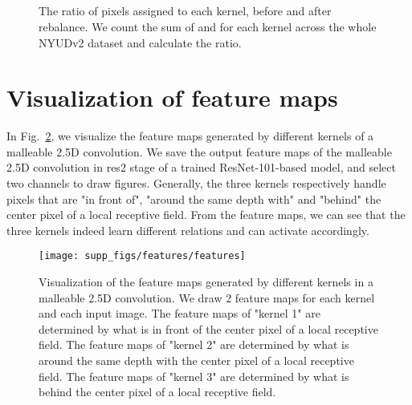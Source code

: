 \documentclass[runningheads]{llncs}
\begin{document}
\begin{figure}[htbp]
  \centering
  \\
  \\
  \\
  \\
  \caption{
    The ratio of pixels assigned to each kernel, before and after rebalance.
    We count the sum of  and  for each kernel across the whole NYUDv2 dataset and calculate the ratio.
  }
  \label{fig:rebalance}
\end{figure}

\section{Visualization of feature maps}
In Fig.~\ref{fig:features}, we visualize the feature maps generated by different kernels of a malleable 2.5D convolution.
We save the output feature maps of the malleable 2.5D convolution in res2 stage of a trained ResNet-101-based model, and select two channels to draw figures.
Generally, the three kernels respectively handle pixels that are "in front of", "around the same depth with" and "behind" the center pixel of a local receptive field.
From the feature maps, we can see that the three kernels indeed learn different relations and can activate accordingly.

\begin{figure}[htbp]
  \centering
  \texttt{[image: supp\_figs/features/features]}
  \caption{
  Visualization of the feature maps generated by different kernels in a malleable 2.5D convolution.
  We draw 2 feature maps for each kernel and each input image.
  The feature maps of "kernel 1" are determined by what is in front of the center pixel of a local receptive field.
  The feature maps of "kernel 2" are determined by what is around the same depth with the center pixel of a local receptive field.
  The feature maps of "kernel 3" are determined by what is behind the center pixel of a local receptive field.
  }
  \label{fig:features}
\end{figure}
\end{document}
